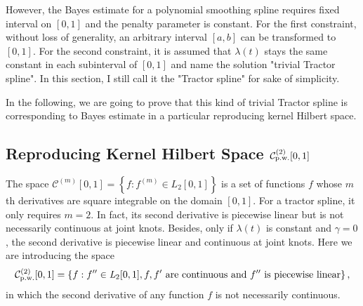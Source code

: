 However, the Bayes estimate for a polynomial smoothing spline requires fixed interval on $[0,1]$ and the penalty parameter is constant. For the first constraint, without loss of generality, an arbitrary interval $[a,b]$ can be transformed to $[0,1]$. For the second constraint, it is assumed that $\lambda(t)$ stays the same constant in each subinterval of $[0,1]$ and name the solution "trivial Tractor spline".  In this section, I still call it the "Tractor spline" for sake of simplicity. 

In the following, we are going to prove that this kind of trivial Tractor spline is corresponding to Bayes estimate in a particular reproducing kernel Hilbert space. 


\subsection{Reproducing Kernel Hilbert Space $\mathcal{C}_{\mbox{\scriptsize p.w.}}^{(2)}[0,1]$}

The space $\mathcal{C}^{(m)}[0,1]=\left\lbrace  f:f^{(m)}\in \mathit{L}_2[0,1] \right\rbrace$ is a set of functions $f$ whose $m$th derivatives are square integrable on the domain $[0,1]$. For a tractor spline, it only requires $m=2$. In fact, its second derivative is piecewise linear but is not necessarily continuous at joint knots. Besides, only if $\lambda(t)$ is constant and $\gamma=0$, the second derivative is piecewise linear and continuous at joint knots. Here we are introducing the space 
\begin{equation*}
\mathcal{C}_{\mbox{\scriptsize p.w.}}^{(2)}[0,1]=\left\lbrace f: f''\in \mathit{L}_2[0,1], f,f' \mbox{ are continuous and } f'' \mbox{ is piecewise linear}\right\rbrace,
\end{equation*}
in which the second derivative of any function $f$ is not necessarily continuous. 


